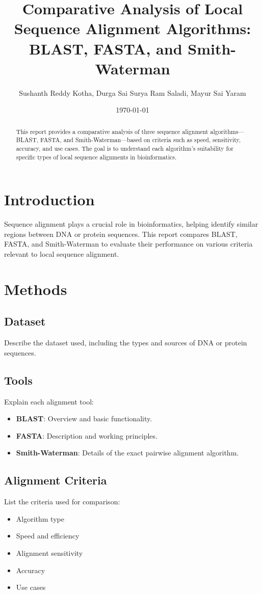 \documentclass[a4paper,12pt]{article}
\title{Comparative Analysis of Local Sequence Alignment Algorithms: BLAST, FASTA, and Smith-Waterman}
\author{Sushanth Reddy Kotha, Durga Sai Surya Ram Saladi, Mayur Sai Yaram}
\date{\today}
\begin{document}
\maketitle

\begin{abstract}
This report provides a comparative analysis of three sequence alignment algorithms—BLAST, FASTA, and Smith-Waterman—based on criteria such as speed, sensitivity, accuracy, and use cases. The goal is to understand each algorithm’s suitability for specific types of local sequence alignments in bioinformatics.
\end{abstract}

\section{Introduction}
Sequence alignment plays a crucial role in bioinformatics, helping identify similar regions between DNA or protein sequences. This report compares BLAST, FASTA, and Smith-Waterman to evaluate their performance on various criteria relevant to local sequence alignment.

\section{Methods}
\subsection{Dataset}
Describe the dataset used, including the types and sources of DNA or protein sequences.

\subsection{Tools}
Explain each alignment tool:
\begin{itemize}
    \item \textbf{BLAST}: Overview and basic functionality.
    \item \textbf{FASTA}: Description and working principles.
    \item \textbf{Smith-Waterman}: Details of the exact pairwise alignment algorithm.
\end{itemize}

\subsection{Alignment Criteria}
List the criteria used for comparison:
\begin{itemize}
    \item Algorithm type
    \item Speed and efficiency
    \item Alignment sensitivity
    \item Accuracy
    \item Use cases
\end{itemize}
\end{document}
